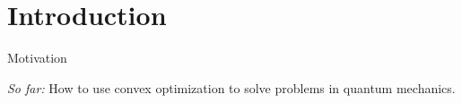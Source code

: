 \section*{Introduction}

\begin{frame}{Motivation}
 
\alert{ \emph{So far:} How to use convex optimization to solve problems in quantum mechanics.}

\vspace{4\floatsep}\pause


% 
% 
% 

\end{frame}

